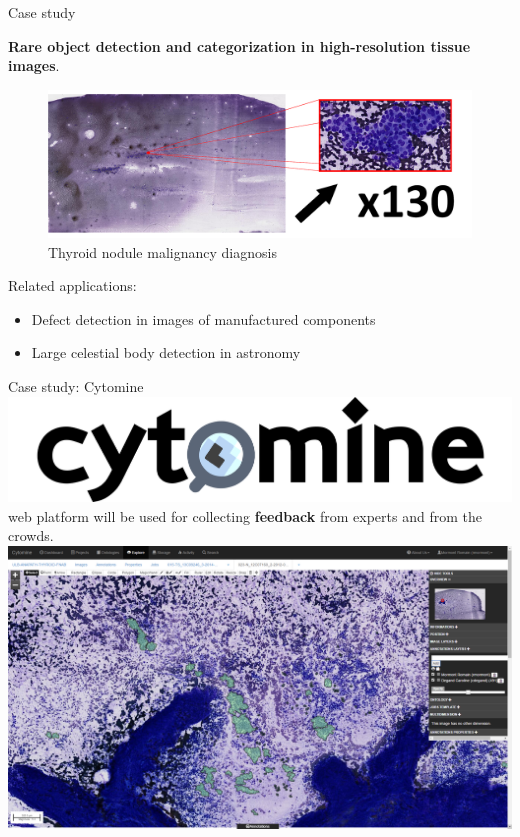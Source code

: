 \documentclass{beamer}
\begin{document}
\begin{frame}{Case study}
	\begin{center}
		\textbf{Rare object detection and categorization in high-resolution tissue images}.
	\end{center}
		
	\begin{figure}[h]
		\center
		\includegraphics[scale=0.125]{images/whole-slide-dim.png}
		\caption{Thyroid nodule malignancy diagnosis}
	\end{figure}
	
	\vfill
	
	Related applications:
	\begin{itemize}
		\item Defect detection in images of manufactured components 
		\item Large celestial body detection in astronomy
	\end{itemize}
	
\end{frame}

\begin{frame}{Case study: Cytomine}
	\includegraphics[scale=0.07]{images/cytomine_typo.png} web platform will be used for collecting \textbf{feedback} from experts and from the crowds. \\  
	\vspace*{0.25cm}
	\hspace*{-0.75in}\includegraphics[scale=0.22]{images/cytomine.png}
\end{frame}
\end{document}

